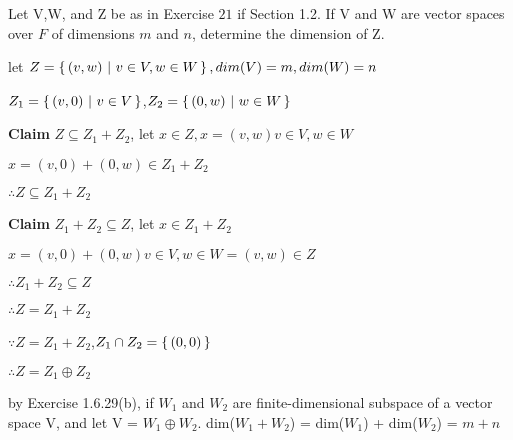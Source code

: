 Let V,W, and Z be as in Exercise $21$ if Section 1.2. If V and W are vector spaces over $F$ of dimensions $m$ and $n$, determine the dimension of Z.

\begin{tcolorbox}
	\begin{solution}
		let $Z = \left\{ \,(v,w) ~|~ v \in V,w \in W \,\right\}, dim(V)=m,dim(W)=n$
		
		$Z_1 = \left\{ \,(v,0) ~|~ v \in V \,\right\}$,$Z_2 = \left\{ \,(0,w) ~|~ w \in W \,\right\}$
		
		\textbf{Claim} $Z \subseteq Z_1 + Z_2$, let $x \in Z, x = (v,w) v\in V,w \in W$
		
		$x = (v,0) + (0,w) \in Z_1 + Z_2$
		
		$\therefore Z \subseteq Z_1 + Z_2$
		
		\textbf{Claim} $Z_1 + Z_2 \subseteq Z$, let $x \in Z_1 + Z_2$
		
		$x = (v,0) + (0,w) v\in V, w \in W = (v,w) \in Z$
		
		$\therefore Z_1 + Z_2 \subseteq Z$
		
		$\therefore Z = Z_1 + Z_2$
		
		$\because Z = Z_1 + Z_2$,$Z_1 \cap Z_2 = \left\{ \,(0,0) \,\right\}$
		
		$\therefore Z = Z_1 \oplus Z_2$
		
		by Exercise 1.6.29(b), if $W_1$ and $W_2$ are finite-dimensional subspace of a vector space V, and let V = $W_1 \oplus W_2$. dim($W_1+W_2$) = dim($W_1$) + dim($W_2$) = $m+n$
			
	\end{solution}
\end{tcolorbox}